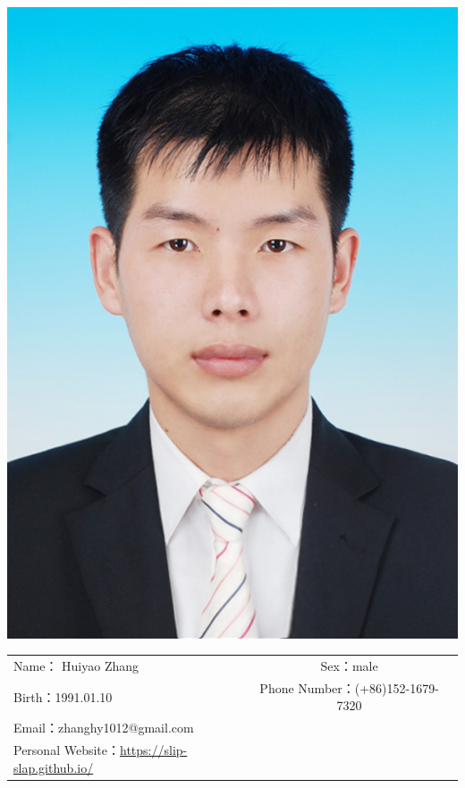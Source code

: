 
\begin{minipage}{0.2\textwidth}
	\includegraphics[scale=1.1]{8574.png}
\end{minipage}
\hfill
\begin{minipage}{0.8\textwidth}
	\renewcommand{\arraystretch}{2.2}
	\begin{adjustbox}{width=1\linewidth}
		\begin{tabular}{lcr}
			Name： Huiyao Zhang & Sex：male \\ 
			Birth：1991.01.10 & Phone Number：(+86)152-1679-7320 \\
			Email：zhanghy1012@gmail.com  &  \\
			Personal Website：\url{https://slip-slap.github.io/}  &\\
		\end{tabular}
	\renewcommand{\arraystretch}{0.5}
	\end{adjustbox}
\end{minipage}
